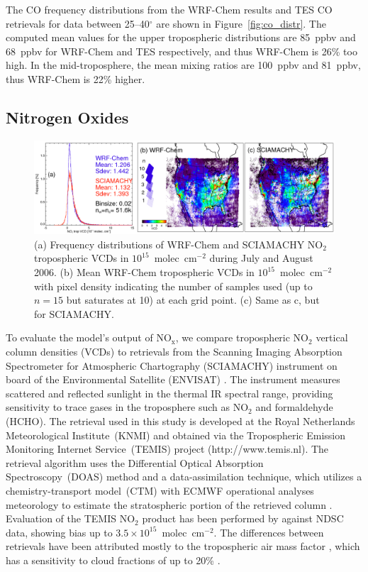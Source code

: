 The CO frequency distributions from the WRF-Chem results and TES CO retrievals for data
between 25--40$^\circ$ are shown in Figure~\ref{fig:co_distr}. The computed
mean values for the upper tropospheric distributions are 85~ppbv and 68~ppbv for
WRF-Chem and TES respectively, and thus WRF-Chem is 26\% too high.
In the mid-troposphere, the mean mixing ratios are 100~ppbv and 81~ppbv, thus
WRF-Chem is 22\% higher.

\subsection{Nitrogen Oxides}\label{sect:val/nox}

 \begin{figure}
 \noindent\includegraphics[width=40pc]{Figures/scia_no2.png}
 \caption[Model vs. observed  tropospheric columns]{(a) Frequency distributions of WRF-Chem and SCIAMACHY NO$_2$ tropospheric
VCDs in $10^{15}$~molec~cm$^{-2}$ during July and August 2006.
(b) Mean WRF-Chem tropospheric VCDs in $10^{15}$~molec~cm$^{-2}$
with pixel density indicating the number of samples used (up to $n=15$ but saturates at
10) at each grid point. (c) Same as c, but for SCIAMACHY.}
 \label{fig:scia_no2}
 \end{figure}

To evaluate the model's output of NO$_{\mathrm{x}}$, we compare tropospheric NO$_2$
vertical column densities (VCDs) to retrievals from the Scanning Imaging Absorption
Spectrometer for Atmospheric Chartography (SCIAMACHY) instrument on board of the
Environmental Satellite (ENVISAT) \citep{Burrows:1995fk,Bovensmann:1999uq}. The
instrument measures scattered and reflected sunlight in the thermal IR spectral range,
providing sensitivity to trace gases in the troposphere such as NO$_2$ and formaldehyde (HCHO). The
retrieval used in this study is developed at the Royal Netherlands Meteorological
Institute~(KNMI) and obtained via the Tropospheric Emission Monitoring Internet
Service~(TEMIS) project (http://www.temis.nl). The retrieval algorithm uses the Differential
Optical Absorption Spectroscopy~(DOAS) method and a data-assimilation technique,
which utilizes a chemistry-transport model~(CTM) with ECMWF operational analyses
meteorology to estimate the stratospheric portion of the retrieved column
\citep{Boersma:2004uq}. Evaluation of the TEMIS NO$_2$ product has been performed
by \citet{Lambert:2004aa} against NDSC data, showing bias up to
$3.5\times10^{15}$~molec~cm$^{-2}$. The differences between retrievals have been
attributed mostly to the tropospheric air mass factor \citep{vanderA:2010aa}, which has
a sensitivity to cloud fractions of up to 20\% \citep{Boersma:2004uq}.


